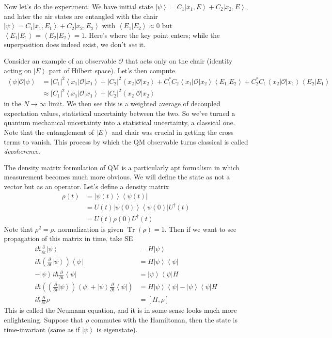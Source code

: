 \documentclass[10pt]{report}
\newcommand{\bra}[1]{\left<#1\right|}
\newcommand{\ket}[1]{\left|#1\right>}
\newcommand{\dotp}[2]{\left<#1\left.\right|#2\right>}
\newcommand{\pd}[2]{\frac{\partial #1}{\partial#2}}
\newcommand{\abs}[1]{\left|#1\right|}
\DeclareMathOperator{\Tr}{Tr}
\begin{document}
Now let's do the experiment. We have initial state $\ket{\psi} = C_1\ket{x_1,E} + C_2\ket{x_2, E}$, and later the air states are entangled with the chair $\ket{\psi} = C_1\ket{x_1, E_1} + C_2\ket{x_2, E_2}$ with $\dotp{E_1}{E_2} \approx 0$ but $\dotp{E_1}{E_1} = \dotp{E_2}{E_2} = 1$. Here's where the key point enters; while the superposition does indeed exist, we don't \emph{see} it.

Consider an example of an observable $\mathcal{O}$ that acts only on the chair (identity acting on $\ket{E}$ part of Hilbert space). Let's then compute 
\begin{align}
    \bra{\psi}\mathcal{O}\ket{\psi} &= \abs{C_1}^2\bra{x_1}\mathcal{O}\ket{x_1} + \abs{C_2}^2\bra{x_2}\mathcal{O}\ket{x_2} + C_1^*C_2\bra{x_1}\mathcal{O}\ket{x_2}\dotp{E_1}{E_2}+ C_2^*C_1\bra{x_2}\mathcal{O}\ket{x_1}\dotp{E_2}{E_1}\\
    &\approx \abs{C_1}^2\bra{x_1}\mathcal{O}\ket{x_1} + \abs{C_2}^2\bra{x_2}\mathcal{O}\ket{x_2}
\end{align}
in the $N \to \infty$ limit. We then see this is a weighted average of decoupled expectation values, statistical uncertainty between the two. So we've turned a quantum mechanical uncertainty into a statistical uncertainty, a classical one. Note that the entanglement of $\ket{E}$ and chair was crucial in getting the cross terms to vanish. This process by which the QM observable turns classical is called \emph{decoherence}.

The density matrix formulation of QM is a particularly apt formalism in which measurement becomes much more obvious. We will define the state as not a vector but as an operator. Let's define a density matrix
\begin{align}
    \rho(t) &= \ket{\psi(t)}\bra{\psi(t)}\\
    &= U(t)\ket{\psi(0)}\bra{\psi(0)}U^\dagger(t)\\
    &= U(t)\rho(0)U^\dagger(t)
\end{align}
Note that $\rho^2 = \rho$, normalization is given $\Tr(\rho) = 1$. Then if we want to see propagation of this matrix in time, take SE
\begin{align}
    i\hbar \pd{}{t}\ket{\psi} &= H\ket{\psi}\\
    i\hbar (\pd{}{t}\ket{\psi})\bra{\psi} &= H\ket{\psi}\bra{\psi}\\
    -\ket{\psi}i\hbar \pd{}{t}\bra{\psi} &= \ket{\psi}\bra{\psi}H\\
    i\hbar \left( (\pd{}{t}\ket{\psi})\bra{\psi} + \ket{\psi}\pd{}{t}\bra{\psi} \right) &= H\ket{\psi}\bra{\psi} - \ket{\psi}\bra{\psi}H\\
    i\hbar \pd{}{t}\rho &= \left[ H,\rho \right]
\end{align}
This is called the Neumann equation, and it is in some sense looks much more enlightening. Suppose that $\rho$ commutes with the Hamiltonan, then the state is time-invariant (same as if $\ket{\psi}$ is eigenstate). 
\end{document}
